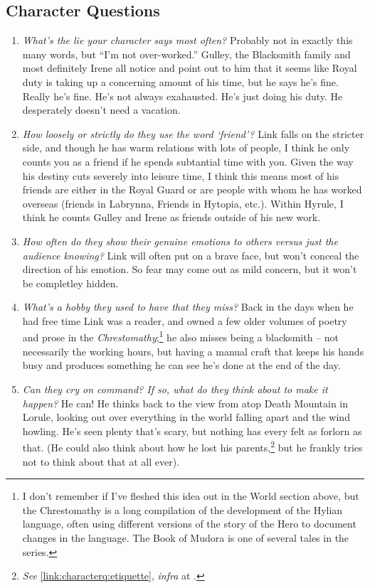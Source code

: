   \subsection{Character Questions}
  \begin{enumerate}
    \item\textit{What’s the lie your character says most often?}
        Probably not in exactly this many words, but ``I'm not over-worked.''  Gulley, the Blacksmith family and most definitely Irene all notice and point out to him that it seems like Royal duty is taking up a concerning amount of his time, but he says he's fine. Really he's fine. He's not always exahausted. He's just doing his duty. He desperately doesn't need a vacation.
    \item\textit{How loosely or strictly do they use the word ‘friend’?}
        Link falls on the stricter side, and though he has warm relations with lots of people, I think he only counts you as a friend if he spends subtantial time with you. Given the way his destiny cuts severely into leisure time, I think this means most of his friends are either in the Royal Guard or are people with whom he has worked overseas (friends in Labrynna, Friends in Hytopia, etc.). Within Hyrule, I think he counts Gulley and Irene as friends outside of his new work.
    \item\textit{How often do they show their genuine emotions to others versus just the audience knowing?}\label{link:characterq:masking}
        Link will often put on a brave face, but won't conceal the direction of his emotion. So fear may come out as mild concern, but it won't be completley hidden. 
    \item\textit{What’s a hobby they used to have that they miss?}
        Back in the days when he had free time Link was a reader, and owned a few older volumes of poetry and prose in the \emph{Chrestomathy};\footnote{I don't remember if I've fleshed this idea out in the World section above, but the Chrestomathy is a long compilation of the development of the Hylian language, often using different versions of the story of the Hero to document changes in the language. The Book of Mudora is one of several tales in the series.} he also misses being a blacksmith -- not necessarily the working hours, but having a manual craft that keeps his hands busy and produces something he can see he's done at the end of the day.
    \item\textit{Can they cry on command? If so, what do they think about to make it happen?}
        He can! He thinks back to the view from atop Death Mountain in Lorule, looking out over everything in the world falling apart and the wind howling. He's seen plenty that's scary, but nothing has every felt as forlorn as that. (He could also think about how he lost his parents,\footnote{\textit{See} \ref{link:characterq:etiquette}, \textit{infra} at \pageref{link:characterq:etiquette}.} but he frankly tries not to think about that at all ever).

\end{enumerate}
